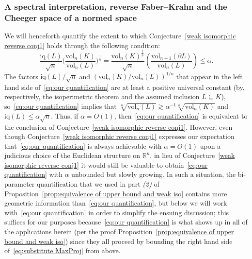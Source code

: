 \documentclass[11pt,reqno]{amsart}
\renewcommand{\le}{\leqslant}
\newcommand{\R}{\mathbb R}
\theoremstyle{remark}
\newcommand{\iq}{\mathrm{iq}}
\renewcommand{\subset}{\subseteq}
\newcommand{\vol}{\mathrm{vol}}
\renewcommand{\1}{\mathbf 1}
\begin{document}
\subsubsection{A spectral interpretation, reverse Faber--Krahn and the Cheeger space of a normed space}\label{sec:spectral} We will henceforth quantify the extent to which  Conjecture~\ref{weak isomorphic reverse conj1} holds through the following condition:
\begin{equation}\label{eq:our quantification}
\frac{\iq(L)}{\sqrt{n}}\bigg(\frac{\vol_n(K)}{\vol_n(L)}\bigg)^{\frac{1}{n}}=\frac{\vol_n(K)^{\frac{1}{n}}}{\sqrt{n}}\left(\frac{\vol_{n-1}(\partial L)}{\vol_n(L)}\right)\le \alpha.
\end{equation}
The factors $\iq(L)/\sqrt{n}$ and $(\vol_n(K)/\vol_n(L))^{1/n}$ that appear in the left hand side of~\eqref{eq:our quantification} are at least a positive universal constant (by, respectively, the isoperimetric theorem and the assumed inclusion $L\subset K$), so~\eqref{eq:our quantification} implies that $\sqrt[n]{\vol_n(L)}\gtrsim \alpha^{-1}\sqrt[n]{\vol_n(K)}$ and $\iq(L)\le \alpha \sqrt{n}$. Thus, if $\alpha=O(1)$, then~\eqref{eq:our quantification} is equivalent to the conclusion of  Conjecture~\ref{weak isomorphic reverse conj1}. However, even though Conjecture~\ref{weak isomorphic reverse conj1} expresses our expectation that~\eqref{eq:our quantification} is always achievable with $\alpha=O(1)$ upon a judicious choice of the Euclidean structure on $\R^n$, in lieu of Conjecture~\ref{weak isomorphic reverse conj1} it would still be valuable to obtain~\eqref{eq:our quantification} with $\alpha$ unbounded but slowly growing. In such a situation, the bi-parameter quantification that we used in part {\em (2)} of Proposition~\ref{prop:equivalence of upper bound and weak iso} contains more geometric information than~\eqref{eq:our quantification}, but below we will work with~\eqref{eq:our quantification} in order to simplify the ensuing discussion; this suffices for our purposes because~\eqref{eq:our quantification} is what shows up  in all of the applications herein (per the proof  Proposition~\ref{prop:equivalence of upper bound and weak iso}) since they all proceed by bounding the right hand side of~\eqref{eq:substitute MaxProj} from above.
\end{document}

